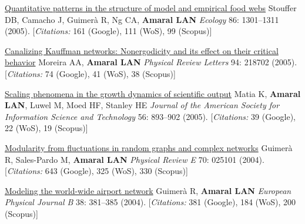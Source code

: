 \NumberedItem{\makebox[0.8cm][r]{[60]}}
\href{/people/amaral/quantitative-patterns-in-the-structure-of-model-and-empirical-food-webs}
{Quantitative patterns in the structure of model and empirical food webs}
\newline
Stouffer DB, Camacho J, Guimer\`a R, Ng CA, {\textbf{Amaral LAN}}
\newline
\textit{Ecology}
    86:
1301--1311 (2005).
    [{\em{Citations:}} 161 (Google), 111 (WoS), 99 (Scopus)]
\newline
\Gap
~
\Gap

\NumberedItem{\makebox[0.8cm][r]{[59]}}
\href{/people/amaral/canalizing-kauffman-networks-nonergodicity-and-its-effect-on-their-critical-behavior}
{Canalizing Kauffman networks: Nonergodicity and its effect on their critical behavior}
\newline
Moreira AA, {\textbf{Amaral LAN}}
\newline
\textit{Physical Review Letters}
    94:
218702 (2005).
    [{\em{Citations:}} 74 (Google), 41 (WoS), 38 (Scopus)]
\newline
\Gap
~
\Gap

\NumberedItem{\makebox[0.8cm][r]{[58]}}
\href{/people/amaral/scaling-phenomena-in-the-growth-dynamics-of-scientific-output}
{Scaling phenomena in the growth dynamics of scientific output}
\newline
Matia K, {\textbf{Amaral LAN}}, Luwel M, Moed HF, Stanley HE
\newline
\textit{Journal of the American Society for Information Science and Technology}
    56:
893--902 (2005).
    [{\em{Citations:}} 39 (Google), 22 (WoS), 19 (Scopus)]
\newline
\Gap
~
\Gap

\NumberedItem{\makebox[0.8cm][r]{[57]}}
\href{/people/amaral/modularity-from-fluctuations-in-random-graphs-and-complex-networks}
{Modularity from fluctuations in random graphs and complex networks}
\newline
Guimer\`a R, Sales-Pardo M, {\textbf{Amaral LAN}}
\newline
\textit{Physical Review E}
    70:
025101 (2004).
    [{\em{Citations:}} 643 (Google), 325 (WoS), 330 (Scopus)]
\newline
\Gap
~
\Gap

\NumberedItem{\makebox[0.8cm][r]{[56]}}
\href{/people/amaral/modeling-the-world-wide-airport-network}
{Modeling the world-wide airport network}
\newline
Guimer\`a R, {\textbf{Amaral LAN}}
\newline
\textit{European Physical Journal B}
    38:
381--385 (2004).
    [{\em{Citations:}} 381 (Google), 184 (WoS), 200 (Scopus)]
\newline
\Gap
~
\Gap

